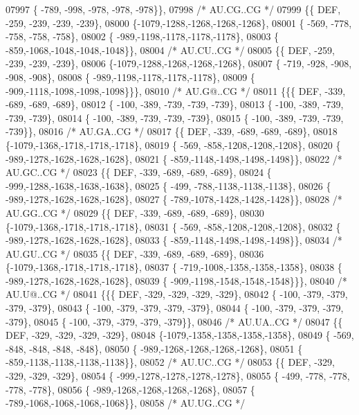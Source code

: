 \begin{DoxyCode}
07997 \{ -789, -998, -978, -978, -978\}\},
07998 \textcolor{comment}{/* AU.CG..CG */}
07999 \{\{  DEF, -259, -239, -239, -239\},
08000 \{-1079,-1288,-1268,-1268,-1268\},
08001 \{ -569, -778, -758, -758, -758\},
08002 \{ -989,-1198,-1178,-1178,-1178\},
08003 \{ -859,-1068,-1048,-1048,-1048\}\},
08004 \textcolor{comment}{/* AU.CU..CG */}
08005 \{\{  DEF, -259, -239, -239, -239\},
08006 \{-1079,-1288,-1268,-1268,-1268\},
08007 \{ -719, -928, -908, -908, -908\},
08008 \{ -989,-1198,-1178,-1178,-1178\},
08009 \{ -909,-1118,-1098,-1098,-1098\}\}\},
08010 \textcolor{comment}{/* AU.G@..CG */}
08011 \{\{\{  DEF, -339, -689, -689, -689\},
08012 \{ -100, -389, -739, -739, -739\},
08013 \{ -100, -389, -739, -739, -739\},
08014 \{ -100, -389, -739, -739, -739\},
08015 \{ -100, -389, -739, -739, -739\}\},
08016 \textcolor{comment}{/* AU.GA..CG */}
08017 \{\{  DEF, -339, -689, -689, -689\},
08018 \{-1079,-1368,-1718,-1718,-1718\},
08019 \{ -569, -858,-1208,-1208,-1208\},
08020 \{ -989,-1278,-1628,-1628,-1628\},
08021 \{ -859,-1148,-1498,-1498,-1498\}\},
08022 \textcolor{comment}{/* AU.GC..CG */}
08023 \{\{  DEF, -339, -689, -689, -689\},
08024 \{ -999,-1288,-1638,-1638,-1638\},
08025 \{ -499, -788,-1138,-1138,-1138\},
08026 \{ -989,-1278,-1628,-1628,-1628\},
08027 \{ -789,-1078,-1428,-1428,-1428\}\},
08028 \textcolor{comment}{/* AU.GG..CG */}
08029 \{\{  DEF, -339, -689, -689, -689\},
08030 \{-1079,-1368,-1718,-1718,-1718\},
08031 \{ -569, -858,-1208,-1208,-1208\},
08032 \{ -989,-1278,-1628,-1628,-1628\},
08033 \{ -859,-1148,-1498,-1498,-1498\}\},
08034 \textcolor{comment}{/* AU.GU..CG */}
08035 \{\{  DEF, -339, -689, -689, -689\},
08036 \{-1079,-1368,-1718,-1718,-1718\},
08037 \{ -719,-1008,-1358,-1358,-1358\},
08038 \{ -989,-1278,-1628,-1628,-1628\},
08039 \{ -909,-1198,-1548,-1548,-1548\}\}\},
08040 \textcolor{comment}{/* AU.U@..CG */}
08041 \{\{\{  DEF, -329, -329, -329, -329\},
08042 \{ -100, -379, -379, -379, -379\},
08043 \{ -100, -379, -379, -379, -379\},
08044 \{ -100, -379, -379, -379, -379\},
08045 \{ -100, -379, -379, -379, -379\}\},
08046 \textcolor{comment}{/* AU.UA..CG */}
08047 \{\{  DEF, -329, -329, -329, -329\},
08048 \{-1079,-1358,-1358,-1358,-1358\},
08049 \{ -569, -848, -848, -848, -848\},
08050 \{ -989,-1268,-1268,-1268,-1268\},
08051 \{ -859,-1138,-1138,-1138,-1138\}\},
08052 \textcolor{comment}{/* AU.UC..CG */}
08053 \{\{  DEF, -329, -329, -329, -329\},
08054 \{ -999,-1278,-1278,-1278,-1278\},
08055 \{ -499, -778, -778, -778, -778\},
08056 \{ -989,-1268,-1268,-1268,-1268\},
08057 \{ -789,-1068,-1068,-1068,-1068\}\},
08058 \textcolor{comment}{/* AU.UG..CG */}

\end{DoxyCode}

